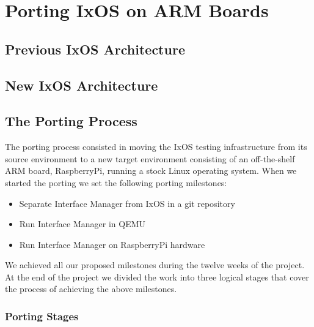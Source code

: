 \section{Porting IxOS on ARM Boards}
\subsection{Previous IxOS Architecture}
\subsection{New IxOS Architecture}

\subsection{The Porting Process}

The porting process consisted in moving the IxOS testing infrastructure from its
source environment to a new target environment consisting of an off-the-shelf
ARM board, RaspberryPi, running a stock Linux operating system. When we started
the porting we set the following porting milestones:
\begin{itemize}
    \item Separate Interface Manager from IxOS in a git repository
    \item Run Interface Manager in QEMU
    \item Run Interface Manager on RaspberryPi hardware
\end{itemize}
We achieved all our proposed milestones during the twelve weeks of the project.
At the end of the project we divided the work into three logical stages
that cover the process of achieving the above milestones.

\subsubsection{Porting Stages}

